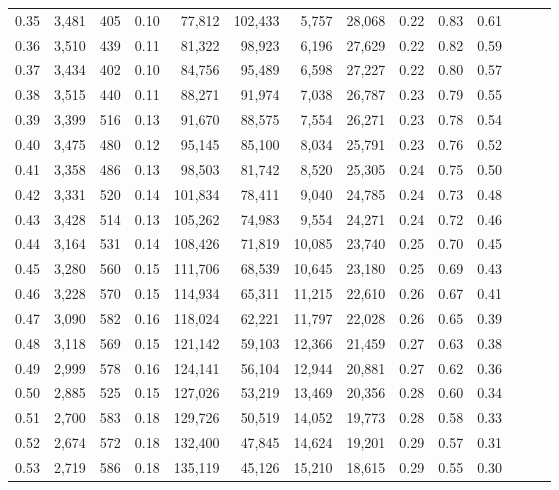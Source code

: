 \begin{tabular}{rrrrrrrrrrrrrr}
0.35 &  3,481 &  405 &  0.10 &   77,812 &  102,433 &   5,757 &  28,068 &  0.22 &  0.83 &      0.61 \\
0.36 &  3,510 &  439 &  0.11 &   81,322 &   98,923 &   6,196 &  27,629 &  0.22 &  0.82 &      0.59 \\
0.37 &  3,434 &  402 &  0.10 &   84,756 &   95,489 &   6,598 &  27,227 &  0.22 &  0.80 &      0.57 \\
0.38 &  3,515 &  440 &  0.11 &   88,271 &   91,974 &   7,038 &  26,787 &  0.23 &  0.79 &      0.55 \\
0.39 &  3,399 &  516 &  0.13 &   91,670 &   88,575 &   7,554 &  26,271 &  0.23 &  0.78 &      0.54 \\
0.40 &  3,475 &  480 &  0.12 &   95,145 &   85,100 &   8,034 &  25,791 &  0.23 &  0.76 &      0.52 \\
0.41 &  3,358 &  486 &  0.13 &   98,503 &   81,742 &   8,520 &  25,305 &  0.24 &  0.75 &      0.50 \\
0.42 &  3,331 &  520 &  0.14 &  101,834 &   78,411 &   9,040 &  24,785 &  0.24 &  0.73 &      0.48 \\
0.43 &  3,428 &  514 &  0.13 &  105,262 &   74,983 &   9,554 &  24,271 &  0.24 &  0.72 &      0.46 \\
0.44 &  3,164 &  531 &  0.14 &  108,426 &   71,819 &  10,085 &  23,740 &  0.25 &  0.70 &      0.45 \\
0.45 &  3,280 &  560 &  0.15 &  111,706 &   68,539 &  10,645 &  23,180 &  0.25 &  0.69 &      0.43 \\
0.46 &  3,228 &  570 &  0.15 &  114,934 &   65,311 &  11,215 &  22,610 &  0.26 &  0.67 &      0.41 \\
0.47 &  3,090 &  582 &  0.16 &  118,024 &   62,221 &  11,797 &  22,028 &  0.26 &  0.65 &      0.39 \\
0.48 &  3,118 &  569 &  0.15 &  121,142 &   59,103 &  12,366 &  21,459 &  0.27 &  0.63 &      0.38 \\
0.49 &  2,999 &  578 &  0.16 &  124,141 &   56,104 &  12,944 &  20,881 &  0.27 &  0.62 &      0.36 \\
0.50 &  2,885 &  525 &  0.15 &  127,026 &   53,219 &  13,469 &  20,356 &  0.28 &  0.60 &      0.34 \\
0.51 &  2,700 &  583 &  0.18 &  129,726 &   50,519 &  14,052 &  19,773 &  0.28 &  0.58 &      0.33 \\
0.52 &  2,674 &  572 &  0.18 &  132,400 &   47,845 &  14,624 &  19,201 &  0.29 &  0.57 &      0.31 \\
0.53 &  2,719 &  586 &  0.18 &  135,119 &   45,126 &  15,210 &  18,615 &  0.29 &  0.55 &      0.30 \\

\end{tabular}
